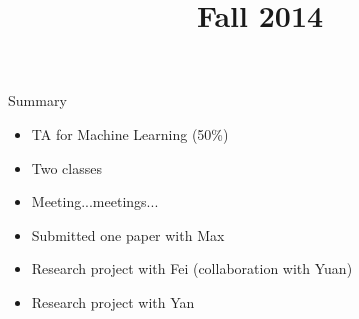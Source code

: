 \documentclass[mathserif, handout]{beamer}
\title[Fall 2014]{Fall 2014}
\institute[USC]{
  University of Southern California
}
\begin{document}
\maketitle
\begin{frame}{Summary}

\begin{itemize}
\item TA for Machine Learning (50\%)
\item Two classes
\item Meeting...meetings...
\item Submitted one paper with Max
\item Research project with Fei (collaboration with Yuan)
\item Research project with Yan
\end{itemize}
\end{frame}
\end{document}
